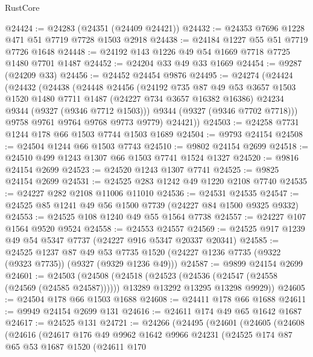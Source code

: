 \begin{lexlean}{RustCore}
\begin{coremodule}
@24424 := @24283 (@24351 (@24409 @24421))
@24432 := @24353 @7696 @1228 @471 @51 @7719 @7728 @1503 @2918
@24438 := @24184 @1227 @55 @51 @7719 @7726 @1648
@24448 := @24192 @143 @1226 @49 @54 @1669 @7718 @7725 @1480 @7701 @1487
@24452 := @24204 @33 @49 @33 @1669
@24454 := @9287 (@24209 @33)
@24456 := @24452 @24454 @9876
@24495 := @24274
    (@24424
      (@24432
        (@24438
          (@24448
            @24456
            (@24192
              @735
              @87
              @49
              @53
              @3657
              @1503
              @1520
              @1480
              @7711
              @1487
              (@24227 @734 @3657 @16382 @16386)
              @24234
              @9344
              (@9327 (@9346 @7712 @1503)))
            @9344
            (@9327 (@9346 @7702 @7718)))
          @9758
          @9761
          @9764
          @9768
          @9773
          @9779)
        @24421))
@24503 := @24258 @7731 @1244 @178 @66 @1503 @7744 @1503 @1689
@24504 := @9793 @24154
@24508 := @24504 @1244 @66 @1503 @7743
@24510 := @9802 @24154 @2699
@24518 := @24510 @499 @1243 @1307 @66 @1503 @7741 @1524 @1327
@24520 := @9816 @24154 @2699
@24523 := @24520 @1243 @1307 @7741
@24525 := @9825 @24154 @2699
@24531 := @24525 @283 @1242 @49 @1220 @2108 @7740
@24535 := @24227 @282 @2108 @11006 @11010
@24536 := @24531 @24535
@24547 := @24525 @85 @1241 @49 @56 @1500 @7739 (@24227 @84 @1500 @9325 @9332)
@24553 := @24525 @108 @1240 @49 @55 @1564 @7738
@24557 := @24227 @107 @1564 @9520 @9524
@24558 := @24553 @24557
@24569 := @24525 @917 @1239 @49 @54 @5347 @7737 (@24227 @916 @5347 @20337 @20341)
@24585 := @24525
    @1237
    @87
    @49
    @53
    @7735
    @1520
    (@24227 @1236 @7735 (@9322 (@9323 @7735)) (@9327 (@9329 @1236 @49)))
@24587 := @9899 @24154 @2699
@24601 := @24503
    (@24508
      (@24518
        (@24523 (@24536 (@24547 (@24558 (@24569 (@24585 @24587))))))
        @13289
        @13292
        @13295
        @13298
        @9929))
@24605 := @24504 @178 @66 @1503 @1688
@24608 := @24411 @178 @66 @1688
@24611 := @9949 @24154 @2699 @131
@24616 := @24611 @174 @49 @65 @1642 @1687
@24617 := @24525 @131
@24721 := @24266
    (@24495
      (@24601
        (@24605
          (@24608
            (@24616
              (@24617
                @176
                @49
                @9962
                @1642
                @9966
                @24231
                (@24525
                  @174
                  @87
                  @65
                  @53
                  @1687
                  @1520
                  (@24611
                    @170

\end{coremodule}
\end{lexlean}
